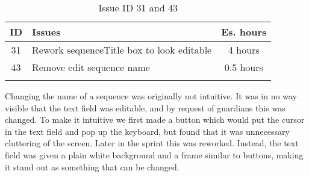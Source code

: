 \begin{longtable} { | c | p{12cm} | c | } 
\hline
	ID 	&	Issues	&		 Es. hours \\\hline
	31 	&	Rework sequenceTitle box to look editable	&	4 hours \\\hline
	43	&	Remove edit sequence name 					&	0.5 hours \\\hline
\caption{Issue ID 31 and 43}
\label{tab:spr2_reworktitlebox}
\end{longtable}

Changing the name of a sequence was originally not intuitive. It was in no way visible that the text field was editable, and by request of guardians this was changed. To make it intuitive we first made a button which would put the cursor in the text field and pop up the keyboard, but found that it was unnecessary cluttering of the screen. Later in the sprint this was reworked. Instead, the text field was given a plain white background and a frame similar to buttons, making it stand out as something that can be changed. 